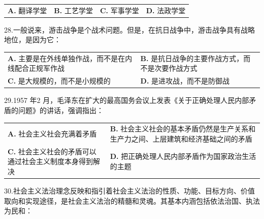 \documentclass[UTF8,11pt]{ctexart}
\begin{document}
\begin{center}\begin{tabular}{>{\raggedright\arraybackslash}p{\dimexpr(\linewidth-8\tabcolsep)/4\relax}>{\raggedright\arraybackslash}p{\dimexpr(\linewidth-8\tabcolsep)/4\relax}>{\raggedright\arraybackslash}p{\dimexpr(\linewidth-8\tabcolsep)/4\relax}>{\raggedright\arraybackslash}p{\dimexpr(\linewidth-8\tabcolsep)/4\relax}}
\textbf{A.} 翻译学堂 & \textbf{B.} 工艺学堂 & \textbf{C.} 军事学堂 & \textbf{D.} 法政学堂\\[.35em]\end{tabular}\end{center}

28.一般说来，游击战争是个战术问题。但是，在抗日战争中，游击战争具有战略地位，是因为它：


\begin{center}\begin{tabular}{>{\raggedright\arraybackslash}p{\dimexpr(\linewidth-4\tabcolsep)/2\relax}>{\raggedright\arraybackslash}p{\dimexpr(\linewidth-4\tabcolsep)/2\relax}}
\textbf{A.} 主要是在外线单独作战，而不是在内线配合正规军作战 & \textbf{B.} 是抗日战争的主要作战方式，而不是次要作战方式\\[.35em]
\textbf{C.} 是大规模的，而不是小规模的 & \textbf{D.} 是进攻战，而不是防御战\\[.35em]\end{tabular}\end{center}

29.1957 年2 月，毛泽东在扩大的最高国务会议上发表《关于正确处理人民内部矛盾的问题》的讲话，强调指出：


\begin{center}\begin{tabular}{>{\raggedright\arraybackslash}p{\dimexpr(\linewidth-4\tabcolsep)/2\relax}>{\raggedright\arraybackslash}p{\dimexpr(\linewidth-4\tabcolsep)/2\relax}}
\textbf{A.} 社会主义社会充满着矛盾 & \textbf{B.} 社会主义社会的基本矛盾仍然是生产关系和生产力之间、上层建筑和经济基础之间的矛盾\\[.35em]
\textbf{C.} 社会主义社会的矛盾可以通过社会主义制度本身得到解决 & \textbf{D.} 把正确处理人民内部矛盾作为国家政治生活的主题\\[.35em]\end{tabular}\end{center}

30.社会主义法治理念反映和指引着社会主义法治的性质、功能、目标方向、价值取向和实现途径，是社会主义法治的精髓和灵魂。其基本内涵包括依法治国、执法为民和：
\end{document}
